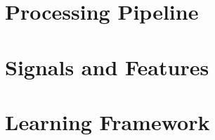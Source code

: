 
\section{Processing Pipeline}
\label{sec:processing_architecture}

\section{Signals and Features}
\label{sec:model}

\section{Learning Framework}
\label{sec:learning_framework}

